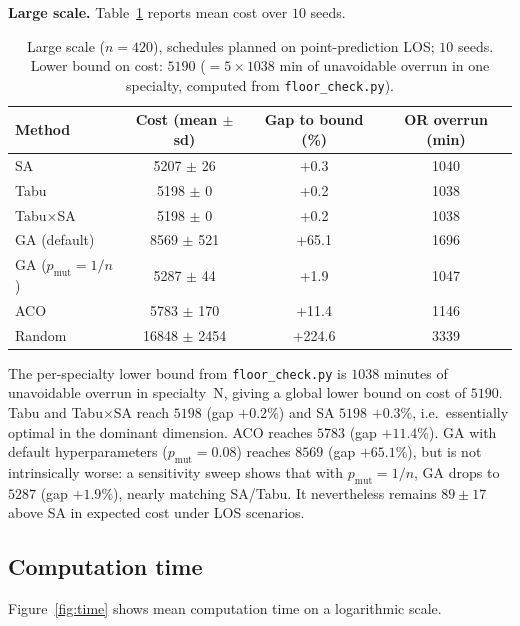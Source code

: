 \documentclass[11pt,a4paper]{article}
\begin{document}
\noindent\textbf{Large scale.} Table~\ref{tab:quality} reports mean cost over \(10\) seeds.

\begin{table}[H]
\centering
\caption{Large scale (\(n=420\)), schedules planned on point-prediction LOS; \(10\) seeds. Lower bound on cost: \(5190\) (\(= 5 \times 1038\) min of unavoidable overrun in one specialty, computed from \texttt{floor\_check.py}).}
\label{tab:quality}
\small
\setlength{\tabcolsep}{4pt}
\begin{tabular}{lccc}
\toprule
Method & {Cost (mean \(\pm\) sd)} & {Gap to bound (\%)} & {OR overrun (min)} \\
\midrule
SA                          & 5207 \(\pm\) 26     & +0.3   & 1040 \\
Tabu                        & 5198 \(\pm\) 0      & +0.2   & 1038 \\
Tabu\(\times\)SA            & 5198 \(\pm\) 0      & +0.2   & 1038 \\
GA (default)                & 8569 \(\pm\) 521    & +65.1  & 1696 \\
GA (\(p_{\mathrm{mut}}=1/n\)) & 5287 \(\pm\) 44   & +1.9   & 1047 \\
ACO                         & 5783 \(\pm\) 170    & +11.4  & 1146 \\
Random                      & 16848 \(\pm\) 2454  & +224.6 & 3339 \\
\bottomrule
\end{tabular}
\normalsize
\end{table}

The per-specialty lower bound from \texttt{floor\_check.py} is \(1038\) minutes of unavoidable overrun in specialty~N, giving a global lower bound on cost of \(5190\). Tabu and Tabu\(\times\)SA reach \(5198\) (gap \(+0.2\%\)) and SA \(5198\) \(+0.3\%\), i.e.\ essentially optimal in the dominant dimension. ACO reaches \(5783\) (gap \(+11.4\%\)). GA with default hyperparameters (\(p_{\mathrm{mut}}=0.08\)) reaches \(8569\) (gap \(+65.1\%\)), but is not intrinsically worse: a sensitivity sweep shows that with \(p_{\mathrm{mut}}=1/n\), GA drops to \(5287\) (gap \(+1.9\%\)), nearly matching SA/Tabu. It nevertheless remains \(89 \pm 17\) above SA in expected cost under LOS scenarios.

\subsection{Computation time}
Figure~\ref{fig:time} shows mean computation time on a logarithmic scale.
\end{document}
